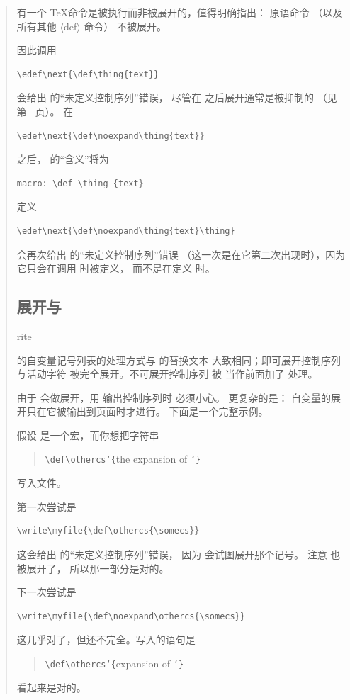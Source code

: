 \documentclass[a4paper]{rapport3}
\makeatletter
\def\lb{{\tt\char`\{}}\def\rb{{\tt\char`\}}}
\def\gr#1{$\langle$#1$\rangle$}\def\key#1{{\tt#1}}
\newenvironment{disp}{\begin{quotation}}{\end{quotation}}
\def\cstoidx#1\par{\index{#1@\cs{#1}}}
\def\csidx#1{\cstoidx #1\par\cs{#1}}
\makeatother
\begin{document}
\begin{disp}
有一个 \TeX 命令是被执行而非被展开的，值得明确指出：
原语命令 （以及所有其他 \gr{def} 命令）
不被展开。

因此调用
\begin{verbatim}
\edef\next{\def\thing{text}}
\end{verbatim}
会给出  的“未定义控制序列”错误，
尽管在  之后展开通常是被抑制的
（见第~\pageref{noexp:list} 页）。
在 \begin{verbatim}
\edef\next{\def\noexpand\thing{text}}
\end{verbatim}
之后， 的“含义”将为 \begin{verbatim}
macro: \def \thing {text}
\end{verbatim}
定义 \begin{verbatim}
\edef\next{\def\noexpand\thing{text}\thing}
\end{verbatim}
会再次给出  的“未定义控制序列”错误
（这一次是在它第二次出现时），因为它只会在调用  时被定义，
而不是在定义  时。


\subsection{展开与 }
\label{expand:write}

\csidx{write} 的自变量记号列表的处理方式与  的替换文本
大致相同；即可展开控制序列与活动字符
被完全展开。不可展开控制序列
被  当作前面加了  处理。

由于  会做展开，用  输出控制序列时
必须小心。
更复杂的是： 自变量的展开只在它被输出到页面时才进行。
下面是一个完整示例。

假设  是一个宏，而你想把字符串 
\begin{disp}\verb-\def\othercs-\lb {\italic the expansion of }\rb
\end{disp}
写入文件。

第一次尝试是
\begin{verbatim}
\write\myfile{\def\othercs{\somecs}}
\end{verbatim}
这会给出  的“未定义控制序列”错误，
\altt
因为  会试图展开那个记号。
注意  也被展开了，
所以那一部分是对的。

下一次尝试是
\begin{verbatim}
\write\myfile{\def\noexpand\othercs{\somecs}}
\end{verbatim}
这几乎对了，但还不完全。写入的语句是
\begin{disp}\verb>\def\othercs>\lb{\italic expansion of }\rb\end{disp}
看起来是对的。


\end{disp}
\end{document}
